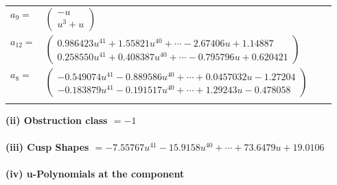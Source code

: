 \documentclass[1p]{elsarticle_modified}
\theoremstyle{definition}
\begin{document}
\begin{tabular}{m{7pt} m{180pt} m{7pt} m{180pt} }
\flushright $a_{9}=$&$\begin{pmatrix}- u\\u^3+u\end{pmatrix}$ \\
\flushright $a_{12}=$&$\begin{pmatrix}0.986423 u^{41}+1.55821 u^{40}+\cdots-2.67406 u+1.14887\\0.258550 u^{41}+0.408387 u^{40}+\cdots-0.795796 u+0.620421\end{pmatrix}$ \\
\flushright $a_{8}=$&$\begin{pmatrix}-0.549074 u^{41}-0.889586 u^{40}+\cdots+0.0457032 u-1.27204\\-0.183879 u^{41}-0.191517 u^{40}+\cdots+1.29243 u-0.478058\end{pmatrix}$\\&\end{tabular}
\flushleft \textbf{(ii) Obstruction class $= -1$}\\~\\
\flushleft \textbf{(iii) Cusp Shapes $= -7.55767 u^{41}-15.9158 u^{40}+\cdots+73.6479 u+19.0106$}\\~\\
\newpage\renewcommand{\arraystretch}{1}
\flushleft \textbf{(iv) u-Polynomials at the component}\newline \\
\end{document}
